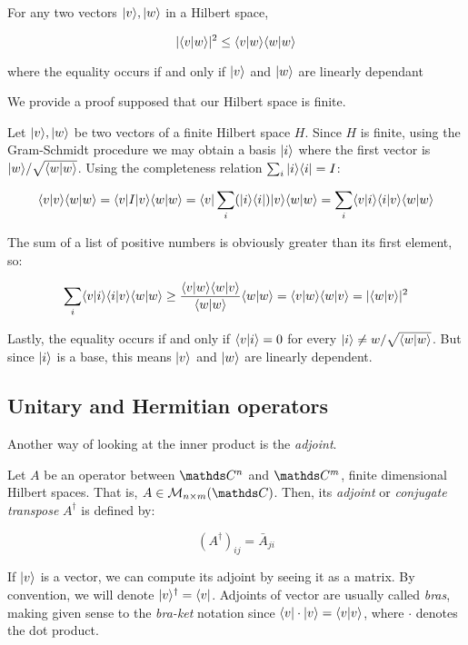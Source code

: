 \begin{corollary}
	For any two vectors $|v\rangle, |w\rangle$ in a Hilbert space,
	
	$$|\langle v|w\rangle|^2 \leq \langle v|w\rangle\langle w|w\rangle$$
	
	where the equality occurs if and only if $|v\rangle$ and $|w\rangle$ are linearly dependant
\end{corollary}
\begin{proofs} 
	We provide a proof supposed that our Hilbert space is finite.
	
	Let $|v\rangle, |w\rangle$ be two vectors of a finite Hilbert space $H$. Since $H$ is finite, using the Gram-Schmidt procedure we may obtain a basis $|i\rangle$ where the first vector is $|w\rangle / \sqrt{\langle w|w\rangle}$. Using the completeness relation $\sum_i |i\rangle \langle i| = I$:
	
	$$\langle v|v\rangle \langle w|w\rangle = \langle v|I|v\rangle \langle w|w\rangle = \langle v| \sum_i (|i\rangle \langle i|) |v\rangle \langle w|w\rangle = \sum_i \langle v|i\rangle \langle i|v\rangle \langle w|w\rangle $$
	
	The sum of a list of positive numbers is obviously greater than its first element, so:
	
	$$ \sum_i \langle v|i\rangle \langle i|v\rangle \langle w|w\rangle \geq  \frac{\langle v|w\rangle \langle w|v\rangle}{\langle w|w\rangle} \langle w|w\rangle = \langle v|w\rangle \langle w|v\rangle  = | \langle w|v\rangle |^2 $$
	
	Lastly, the equality occurs if and only if $\langle v|i\rangle = 0$ for every $|i\rangle \neq w / \sqrt{\langle w|w\rangle}$. But since $|i\rangle$ is a base, this means $|v\rangle$ and $|w\rangle$ are linearly dependent.	
\end{proofs}


\subsection{Unitary and Hermitian operators}


Another way of looking at the inner product is the \emph{adjoint}.

\begin{definition}
	Let $A$ be an operator between $\C^n$ and $\C^m$, finite dimensional Hilbert spaces. That is, $A \in \mathcal{M}_{n{\times}m}(\C)$. Then, its \emph{adjoint} or \emph{conjugate transpose} $A^\dagger$ is defined by:
	
	$$ (A^\dagger)_{ij} = \bar A_{ji} $$
\end{definition}

If $|v\rangle$ is a vector, we can compute its adjoint by seeing it as a matrix. By convention, we will denote $|v\rangle^\dagger = \langle v|$. Adjoints of vector are usually called \emph{bras}, making given sense to the \emph{bra-ket} notation since $\langle v| \cdot |v\rangle = \langle v|v\rangle$, where $\cdot$ denotes the dot product.

